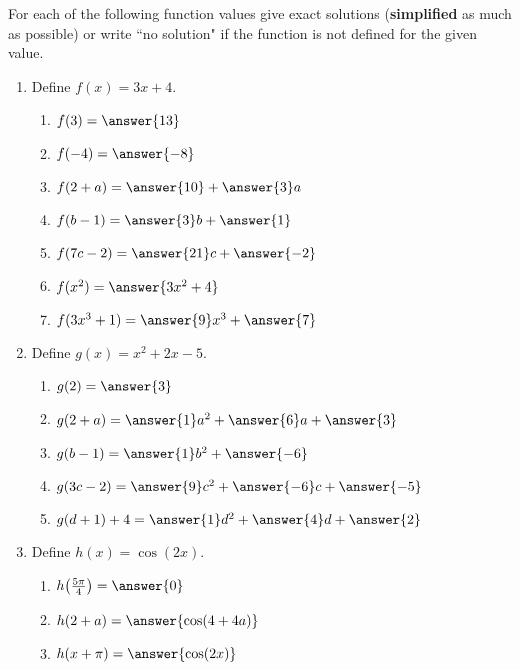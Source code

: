 \documentclass{ximera}
\author{Elizabeth Campolongo}
\begin{document}
\begin{exercise}
For each of the following function values give exact solutions ({\bf simplified} as much as possible) or write ``no solution" if the function is not defined for the given value.
%
\begin{enumerate}
%
\item Define $f(x)= 3x+4.$
\begin{enumerate}
\item $f(3) = \answer{13}$

\item $f(-4) = \answer{-8}$

\item $f(2+a)=\answer{10}+\answer{3}a$

\item $f(b-1) = \answer{3}b+\answer{1}$

\item $f(7c-2) = \answer{21}c+\answer{-2}$

\item $f(x^2) = \answer{3x^2+4}$

\item $f(3x^3+1) = \answer{9}x^3 +\answer{7}$
\end{enumerate}

\item Define $g(x)= x^2+2x-5.$
\begin{enumerate}
\item $g(2) = \answer{3}$

\item $g(2+a)=\answer{1}a^2+\answer{6}a+\answer{3}$

\item $g(b-1) = \answer{1}b^2+ \answer{-6}$

\item $g(3c-2) = \answer{9}c^2 +\answer{-6}c + \answer{-5}$

\item $g(d+1)+4 = \answer{1}d^2+\answer{4}d+\answer{2}$
\end{enumerate}


\item Define $h(x)= \cos(2x).$
\begin{enumerate}
\item $h\!\left(\frac{5\pi}{4}\right) = \answer{0}$

\item $h(2+a)=\answer{\cos(4+4a)}$

\item $h(x+\pi) = \answer{\cos(2x)}$


\end{enumerate}
\end{enumerate}
\end{exercise}
\end{document}
